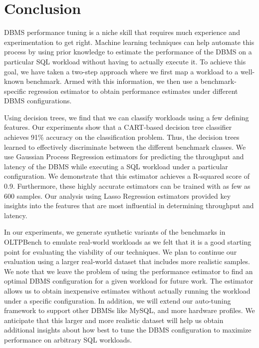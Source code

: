 \section{Conclusion} \label{sec:conclusion}

DBMS performance tuning is a niche skill that requires much experience
and experimentation to get right. Machine learning techniques can help 
automate this process by using prior knowledge to estimate the 
performance of the DBMS on a particular SQL workload 
without having to actually execute it. 
To achieve this goal, we have taken a two-step approach where 
we first map a workload to a well-known benchmark. 
Armed with this information, we then use a benchmark-specific
regression estimator to obtain performance estimates 
under different DBMS configurations.

Using decision trees, we find that we can classify workloads 
using a few defining features.  
Our experiments show that a CART-based decision tree classifier
achieves 91\% accuracy on the classification problem.
Thus, the decision trees learned to effectively discriminate 
between the different benchmark classes.
We use Gaussian Process Regression estimators for predicting 
the throughput and latency of the DBMS while executing a
SQL workload under a particular configuration.
We demonstrate that this estimator achieves a R-squared score 
of 0.9. 
Furthermore, these highly accurate estimators can be trained 
with as few as 600 samples. 
Our analysis using Lasso Regression estimators provided key 
insights into the features that are most influential in 
determining throughput and latency.

In our experiments, we generate synthetic variants of the
benchmarks in OLTPBench to emulate real-world workloads as
we felt that it is a good starting point for evaluating the
viability of our techniques.
We plan to continue our evaluation using a larger real-world
dataset that includes more realistic samples. 
We note that we leave the problem of using the performance 
estimator to find an optimal DBMS configuration for a given 
workload for future work. The estimator allows us to obtain 
inexpensive estimates without actually running the workload 
under a specific configuration.
In addition, we will extend our auto-tuning framework to 
support other DBMSs like MySQL, and more hardware profiles. 
We anticipate that this larger and more realistic dataset 
will help us obtain additional insights about how best to 
tune the DBMS configuration to maximize performance on 
arbitrary SQL workloads.
